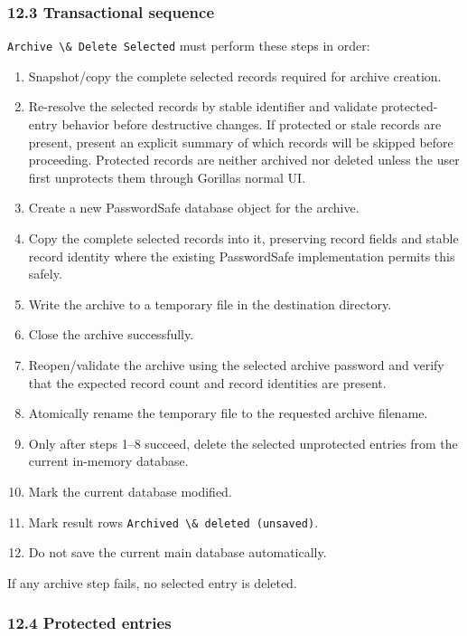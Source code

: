\documentclass[
  letterpaper,
]{article}
\newcommand{\passthrough}[1]{#1}
\providecommand{\tightlist}{%
  \setlength{\itemsep}{0pt}\setlength{\parskip}{0pt}}
\begin{document}
\subsubsection{12.3 Transactional sequence}\label{123-transactional-sequence}

\passthrough{\lstinline!Archive \& Delete Selected!} must perform these steps in order:

\begin{enumerate}
\def\labelenumi{\arabic{enumi}.}
\tightlist
\item
  Snapshot/copy the complete selected records required for archive creation.
\item
  Re-resolve the selected records by stable identifier and validate protected-entry behavior before destructive changes.
  If protected or stale records are present, present an explicit summary of which records will be skipped before
  proceeding. Protected records are neither archived nor deleted unless the user first unprotects them through
  Gorilla\textquotesingle s normal UI.
\item
  Create a new PasswordSafe database object for the archive.
\item
  Copy the complete selected records into it, preserving record fields and stable record identity where the existing
  PasswordSafe implementation permits this safely.
\item
  Write the archive to a temporary file in the destination directory.
\item
  Close the archive successfully.
\item
  Reopen/validate the archive using the selected archive password and verify that the expected record count and record
  identities are present.
\item
  Atomically rename the temporary file to the requested archive filename.
\item
  Only after steps 1--8 succeed, delete the selected unprotected entries from the current in-memory database.
\item
  Mark the current database modified.
\item
  Mark result rows \passthrough{\lstinline!Archived \& deleted (unsaved)!}.
\item
  Do not save the current main database automatically.
\end{enumerate}

If any archive step fails, no selected entry is deleted.

\subsubsection{12.4 Protected entries}\label{124-protected-entries}
\end{document}
